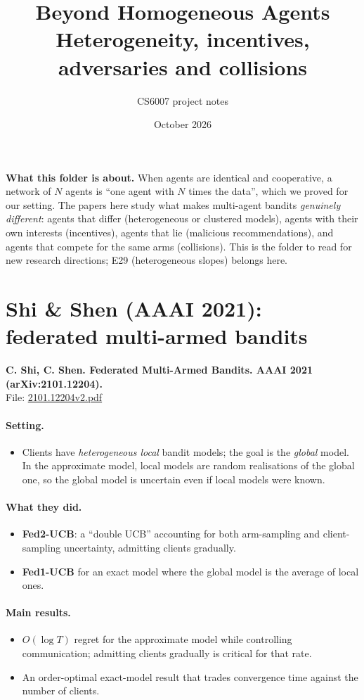 \documentclass[11pt]{article}
\title{Beyond Homogeneous Agents\\[2pt]\large Heterogeneity, incentives, adversaries and collisions}
\author{CS6007 project notes}
\date{October 2026}
\newcommand{\file}[1]{\url{#1}}
\begin{document}
\maketitle
\textbf{What this folder is about.} When agents are identical and cooperative, a network
of $N$ agents is ``one agent with $N$ times the data'', which we proved for our setting. The
papers here study what makes multi-agent bandits \emph{genuinely different}: agents that differ
(heterogeneous or clustered models), agents with their own interests (incentives), agents that
lie (malicious recommendations), and agents that compete for the same arms (collisions). This is
the folder to read for new research directions; E29 (heterogeneous slopes) belongs here.
\tableofcontents
\bigskip
\section{Shi \& Shen (AAAI 2021): federated multi-armed bandits}
\textbf{C. Shi, C. Shen. Federated Multi-Armed Bandits. AAAI 2021 (arXiv:2101.12204).}\\ File: \file{2101.12204v2.pdf}
\paragraph{Setting.}
\begin{itemize}\item Clients have \emph{heterogeneous local} bandit models; the goal is the \emph{global} model. In the approximate model, local models are random realisations of the global one, so the global model is uncertain even if local models were known.\end{itemize}
\paragraph{What they did.}
\begin{itemize}\item \textbf{Fed2-UCB}: a ``double UCB'' accounting for both arm-sampling and client-sampling uncertainty, admitting clients gradually.\item \textbf{Fed1-UCB} for an exact model where the global model is the average of local ones.\end{itemize}
\paragraph{Main results.}
\begin{itemize}\item $O(\log T)$ regret for the approximate model while controlling communication; admitting clients gradually is critical for that rate.\item An order-optimal exact-model result that trades convergence time against the number of clients.\end{itemize}
\end{document}
